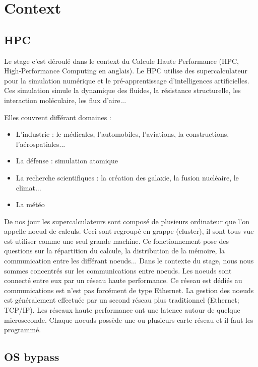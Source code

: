 \section{Context}

\subsection{HPC}

Le stage c'est déroulé dans le context du Calcule Haute Performance (HPC, High-Performance Computing en anglais).
Le HPC utilise des supercalculateur pour la simulation numérique et le pré-apprentissage d'intelligences artificielles.
Ces simulation simule la dynamique des fluides, la résistance structurelle, les interaction moléculaire, les flux d'aire...

\bigskip

Elles couvrent différant domaines :
\begin{itemize}
  \item L'industrie : le médicales, l'automobiles, l'aviations, la constructions, l'aérospatiales...
  \item La défense : simulation atomique
  \item La recherche scientifiques : la création des galaxie, la fusion nucléaire, le climat...
  \item La météo
\end{itemize}

\bigskip

De nos jour les supercalculateurs sont composé de plusieurs ordinateur que l'on appelle noeud de calculs.
Ceci sont regroupé en grappe (cluster), il sont tous vue est utiliser comme une seul grande machine.
Ce fonctionnement pose des questions sur la répartition du calcule, la distribution de la mémoire, la communication entre les différant noeuds...
Dans le contexte du stage, nous nous sommes concentrés sur les communications entre noeuds.
Les noeuds sont connecté entre eux par un réseau haute performance.
Ce réseau est dédiés au communications est n'est pas forcément de type Ethernet.
La gestion des noeuds est généralement effectuée par un second réseau plus traditionnel (Ethernet; TCP/IP).
Les réseaux haute performance ont une latence autour de quelque microseconde.
Chaque noeuds possède une ou plusieurs carte réseau et il faut les programmé.

\subsection{OS bypass}


